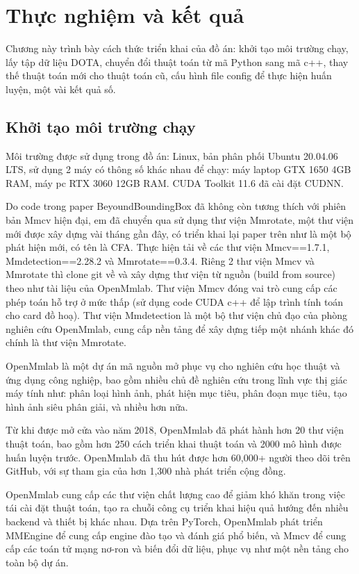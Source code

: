 \documentclass[12pt,a4paper,openany,oneside]{report}
\begin{document}
\chapter{Thực nghiệm và kết quả}

Chương này trình bày cách thức triển khai của đồ án: khởi tạo môi trường chạy, lấy tập dữ liệu DOTA, chuyển đổi thuật toán từ mã Python sang mã c++, thay thế thuật toán mới cho thuật toán cũ, cấu hình file config để thực hiện huấn luyện, một vài kết quả số.
\section{Khởi tạo môi trường chạy} 

Môi trường được sử dụng trong đồ án: Linux, bản phân phối Ubuntu 20.04.06 LTS, sử dụng 2 máy có thông số khác nhau để chạy: máy laptop GTX 1650 4GB RAM, máy pc RTX 3060 12GB RAM. CUDA Toolkit 11.6 đã cài đặt CUDNN.

Do code trong paper BeyoundBoundingBox đã không còn tương thích với phiên bản Mmcv \cite{Mmcv} hiện đại, em đã chuyển qua sử dụng thư viện Mmrotate, một thư viện mới được xây dựng vài tháng gần đây, có triển khai lại paper trên như là một bộ phát hiện mới, có tên là CFA. Thực hiện tải về các thư viện Mmcv==1.7.1, Mmdetection==2.28.2 và Mmrotate==0.3.4. Riêng 2 thư viện Mmcv và Mmrotate \cite{MMRotate} thì clone git về và xây dựng thư viện từ nguồn (build from source) theo như tài liệu của OpenMmlab. Thư viện Mmcv đóng vai trò cung cấp các phép toán hỗ trợ ở mức thấp (sử dụng code CUDA c++ để lập trình tính toán cho card đồ hoạ). Thư viện Mmdetection \cite{MMDetection} là một bộ thư viện chủ đạo của phòng nghiên cứu OpenMmlab, cung cấp nền tảng để xây dựng tiếp một nhánh khác đó chính là thư viện Mmrotate. 

OpenMmlab là một dự án mã nguồn mở phục vụ cho nghiên cứu học thuật và ứng dụng công nghiệp, bao gồm nhiều chủ đề nghiên cứu trong lĩnh vực thị giác máy tính như: phân loại hình ảnh, phát hiện mục tiêu, phân đoạn mục tiêu, tạo hình ảnh siêu phân giải, và nhiều hơn nữa.

Từ khi được mở cửa vào năm 2018, OpenMmlab đã phát hành hơn 20 thư viện thuật toán, bao gồm hơn 250 cách triển khai thuật toán và 2000 mô hình được huấn luyện trước. OpenMmlab đã thu hút được hơn 60,000+ người theo dõi trên GitHub, với sự tham gia của hơn 1,300 nhà phát triển cộng đồng.

OpenMmlab cung cấp các thư viện chất lượng cao để giảm khó khăn trong việc tái cài đặt thuật toán, tạo ra chuỗi công cụ triển khai hiệu quả hướng đến nhiều backend và thiết bị khác nhau. Dựa trên PyTorch, OpenMmlab phát triển MMEngine để cung cấp engine đào tạo và đánh giá phổ biến, và Mmcv để cung cấp các toán tử mạng nơ-ron và biến đổi dữ liệu, phục vụ như một nền tảng cho toàn bộ dự án.
\end{document}
